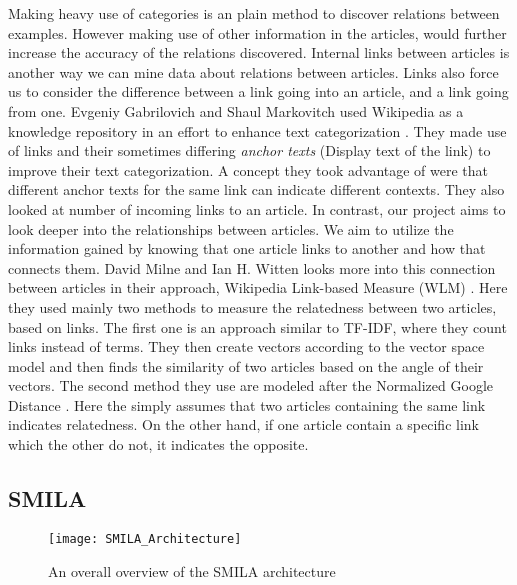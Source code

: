 Making heavy use of categories is an plain method to discover relations between examples. However making use of other information in the articles, would further increase the accuracy of the relations discovered. Internal links between articles is another way we can mine data about relations between articles. Links also force us to consider the difference between a link going into an article, and a link going from one. Evgeniy Gabrilovich and Shaul Markovitch used Wikipedia as a knowledge repository in an effort to enhance text categorization  \cite{text-cat}. They made use of links and their sometimes differing \textit{anchor texts} (Display text of the link) to improve their text categorization. A concept they took advantage of were that different anchor texts for the same link can indicate different contexts.  They also looked at number of incoming links to an article. In contrast, our project aims to look deeper into the relationships between articles. We aim to utilize the information gained by knowing that one article links to another and how that connects them. David Milne and Ian H. Witten looks more into this connection between articles in their approach,  Wikipedia Link-based Measure (WLM) \cite{wlm}. Here they used mainly two methods to measure the relatedness between two articles, based on links. The first one is an approach similar to TF-IDF, where they count links instead of terms. They then create vectors according to the vector space model and then finds the similarity of two articles based on the angle of their vectors. The second method they use are modeled after the Normalized Google Distance  \cite{gsd}. Here the simply assumes that two articles containing the same link indicates relatedness. On the other hand, if one article contain a specific link which the other do not, it indicates the opposite.

\subsection{SMILA} \label{smila}

\begin{figure}[h]
\caption{An overall overview of the SMILA architecture}
\texttt{[image: SMILA\_Architecture]}
\end{figure}




